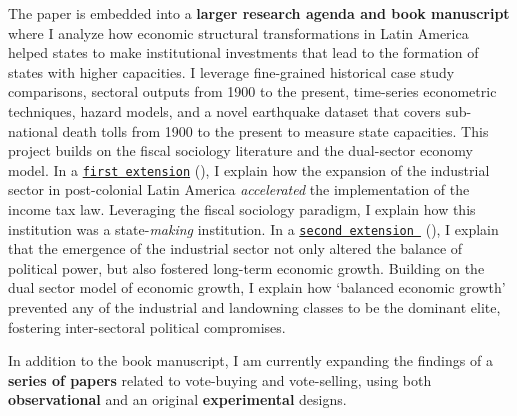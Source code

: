 The paper is embedded into a {\bf larger research agenda and book manuscript} where I analyze how economic structural transformations in Latin America helped states to make institutional investments that lead to the formation of states with higher capacities. I leverage fine-grained historical case study comparisons, sectoral outputs from 1900 to the present, time-series econometric techniques, hazard models, and a novel earthquake dataset that covers sub-national death tolls from 1900 to the present to measure state capacities. This project builds on the fiscal sociology literature and the dual-sector economy model. In a \href{http://github.com/hbahamonde/IncomeTaxAdoption/raw/master/Bahamonde_IncomeTaxAdoption.pdf}{\texttt{first extension}} (\emph{\unskip}), I explain how the expansion of the industrial sector in post-colonial Latin America \emph{accelerated} the implementation of the income tax law. Leveraging the fiscal sociology paradigm, I explain how this institution was a state-\emph{making} institution. In a \href{https://github.com/hbahamonde/Negative_Link_Paper/raw/master/Bahamonde_NegativeLink.pdf}{\texttt{second extension }} (\emph{\unskip}), I explain that the emergence of the industrial sector not only altered the balance of political power, but also fostered long-term economic growth. Building on the dual sector model of economic growth, I explain how `balanced economic growth' prevented any of the industrial and landowning classes to be the dominant elite, fostering inter-sectoral political compromises.

In addition to the book manuscript, I am currently expanding the findings of a {\bf series of papers} related to vote-buying and vote-selling, using both {\bf observational} and an original {\bf experimental} designs. 

